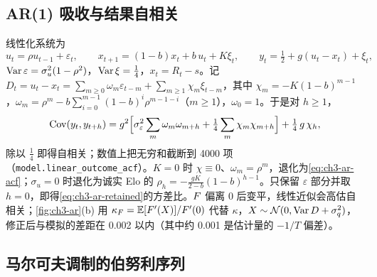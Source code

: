\subsection{AR(1) 吸收与结果自相关}
\label{app:ch3-ar}

线性化系统为
\[
u_t=\rho u_{t-1}+\varepsilon_t,\qquad x_{t+1}=(1-b)x_t+b\,u_t+K\xi_t,\qquad y_t=\tfrac12+g(u_t-x_t)+\xi_t ,
\]
$\operatorname{Var}\varepsilon=\sigma_u^2(1-\rho^2)$，$\operatorname{Var}\xi=\frac14$，$x_t=R_t-s$。记 $D_t=u_t-x_t=\sum_{m\ge0}\omega_m\varepsilon_{t-m}+\sum_{m\ge1}\chi_m\xi_{t-m}$，其中 $\chi_m=-K(1-b)^{m-1}$，$\omega_m=\rho^m-b\sum_{i=0}^{m-1}(1-b)^i\rho^{m-1-i}$（$m\ge1$），$\omega_0=1$。于是对 $h\ge1$，
\[
\operatorname{Cov}(y_t,y_{t+h})=g^2\Big[\sigma_\varepsilon^2\sum_m\omega_m\omega_{m+h}+\tfrac14\sum_m\chi_m\chi_{m+h}\Big]+\tfrac14\,g\,\chi_h ,
\]
除以 $\frac14$ 即得自相关；数值上把无穷和截断到 4000 项（\texttt{model.linear\_outcome\_acf}）。$K=0$ 时 $\chi\equiv0$、$\omega_m=\rho^m$，退化为\cref{eq:ch3-ar-acf}；$\sigma_u=0$ 时退化为诚实 Elo 的 $\rho_h=-\frac{gK}{2-b}(1-b)^{h-1}$。只保留 $\varepsilon$ 部分并取 $h=0$，即得\cref{eq:ch3-ar-retained}的方差比。$F$ 偏离 0 后变平，线性近似会高估自相关；\cref{fig:ch3-ar}(b) 用 $\kappa_F=\mathbb{E}[F'(X)]/F'(0)$ 代替 $\kappa$，$X\sim\mathcal{N}(0,\operatorname{Var} D+\sigma_q^2)$，修正后与模拟的差距在 0.002 以内（其中约 0.001 是估计量的 $-1/T$ 偏差）。

\subsection{马尔可夫调制的伯努利序列}
\label{app:ch3-chain}

